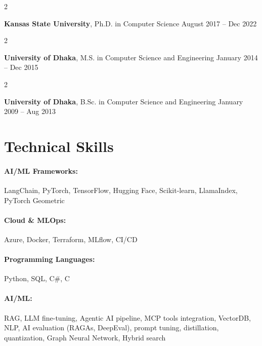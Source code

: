 \documentclass[10pt, letterpaper]{article}
\newenvironment{twocolentry}[2][]{
    \onecolentry
    \def\secondColumn{#2}
    \setcolumnwidth{\fill, 4.5 cm}
    \begin{paracol}{2}
}{
    \switchcolumn \raggedleft \secondColumn
    \end{paracol}
    \endonecolentry
} %
\begin{document}
        \begin{twocolentry}{
            August 2017 -- Dec 2022
        }
            \textbf{Kansas State University}, Ph.D. in Computer Science\end{twocolentry}

        \begin{twocolentry}{
            January 2014 -- Dec 2015
        }
            \textbf{University of Dhaka}, M.S. in Computer Science and Engineering\end{twocolentry}

        \begin{twocolentry}{
            January 2009 -- Aug 2013
        }
            \textbf{University of Dhaka}, B.Sc. in Computer Science and Engineering\end{twocolentry}

\vspace{-1mm}
\section{Technical Skills}

        \paragraph{AI/ML Frameworks:} LangChain, PyTorch, TensorFlow, Hugging Face, Scikit-learn, LlamaIndex, PyTorch Geometric
        \vspace{-4mm}
        \paragraph{Cloud \& MLOps:} Azure, Docker, Terraform, MLflow, CI/CD
        \vspace{-4mm}
        \paragraph{Programming Languages:} Python, SQL, C\#, C
        \vspace{-4mm}
        \paragraph{AI/ML:} RAG, LLM fine-tuning, Agentic AI pipeline, MCP tools integration, VectorDB, NLP, AI evaluation (RAGAs, DeepEval), prompt tuning, distillation, quantization, Graph Neural Network, Hybrid search
\end{document}
